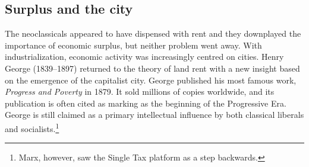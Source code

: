 






\subsection{Surplus  and the city} \label{section-rent-industrial-city}
The neoclassicals appeared to have dispensed with rent and they downplayed the importance of economic surplus, but neither problem went away. With industrialization, economic activity was increasingly centred on cities. Henry George (1839--1897) returned to the theory of land rent with a new insight based on the emergence of the capitalist city. George  published his most famous work, \textit{Progress and Poverty} in 1879\cite{georgeProgressPovertyInquiry1973}. It sold millions of copies worldwide, and its publication is  often cited as marking as the beginning of the Progressive Era. George is still claimed as a primary intellectual influence by both classical liberals and socialists.\footnote{Marx, however, saw the Single Tax platform as a step backwards.} 

